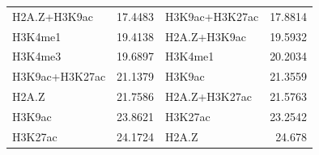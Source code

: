 \documentclass{bioinfo}
\begin{document}
\begin{table}[t]
\begin{center}
\begin{tabular}{ |lr|lr| }
    H2A.Z+H3K9ac & 17.4483 & H3K9ac+H3K27ac & 17.8814 \\
    H3K4me1 & 19.4138 & H2A.Z+H3K9ac & 19.5932 \\
    H3K4me3 & 19.6897 & H3K4me1 & 20.2034 \\
    H3K9ac+H3K27ac & 21.1379 & H3K9ac & 21.3559 \\
    H2A.Z & 21.7586 & H2A.Z+H3K27ac & 21.5763 \\
    H3K9ac & 23.8621 & H3K27ac & 23.2542 \\
    H3K27ac & 24.1724 & H2A.Z & 24.678 \\
    \hline
  \end{tabular}
\end{center}
\vspace{0.0cm}
\end{table}
\end{document}
